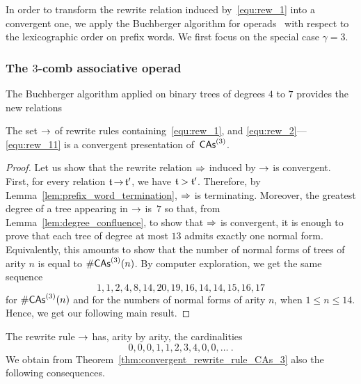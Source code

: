 In order to transform the rewrite relation induced by~\eqref{equ:rew_1}
into a convergent one, we apply the Buchberger algorithm for
operads~\cite[Section 3.7]{DK10} with respect to the lexicographic order
on prefix words. We first focus on the special case $\gamma = 3$.

\subsubsection{The \texorpdfstring{$3$}{3}-comb associative operad}
\label{subsubsec:CAs_3}

The Buchberger algorithm applied on binary trees of degrees $4$ to $7$ 
provides the new relations \smallbreak

\medbreak

\begin{Theorem} \label{thm:convergent_rewrite_rule_CAs_3}
    The set $\operatorname{\to}$ of rewrite rules containing~\eqref{equ:rew_1},
    and \eqref{equ:rew_2}---\eqref{equ:rew_11} is a
    convergent presentation of~$\mathsf{CAs}^{\left(3\right)}$.
\end{Theorem}
\begin{proof}
    Let us show that the rewrite relation $\operatorname{\Rightarrow}$ induced by
    $\operatorname{\to}$ is convergent. First, for every relation $\mathfrak{t} \operatorname{\to} \mathfrak{t}'$,
    we have $\mathfrak{t} > \mathfrak{t}'$. Therefore, by
    Lemma~\ref{lem:prefix_word_termination}, $\operatorname{\Rightarrow}$ is
    terminating. Moreover, the greatest degree of a tree appearing in
    $\operatorname{\to}$ is~$7$ so that, from Lemma~\ref{lem:degree_confluence}, to
    show that $\operatorname{\Rightarrow}$ is convergent, it is enough to prove that
    each tree of degree at most $13$ admits exactly one normal form.
    Equivalently, this amounts to show that the number of normal forms
    of trees of arity $n$ is equal to $\#\mathsf{CAs}^{\left(3\right)}(n)$. By computer
    exploration, we get the same sequence
    \begin{equation} \label{equ:dimensions_CAs_3}
        1, 1, 2, 4, 8, 14, 20, 19, 16, 14, 14, 15, 16, 17
    \end{equation}
    for $\#\mathsf{CAs}^{\left(3\right)}(n)$ and for the numbers of normal forms of arity $n$,
    when $ 1 \leq n \leq 14$. Hence, we get our following main result.
\end{proof}
\medbreak

The rewrite rule $\operatorname{\to}$ has, arity by arity, the cardinalities
\begin{equation}
    0, 0, 0, 1, 1, 2, 3, 4, 0, 0, \dots~.
\end{equation}
We obtain from Theorem~\ref{thm:convergent_rewrite_rule_CAs_3} also
the following consequences.
\medbreak

